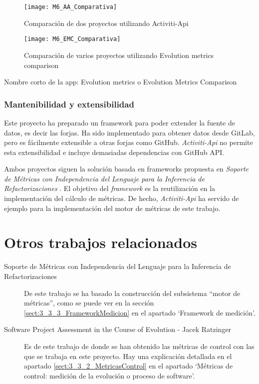 \begin{figure}[!h]
	\centering
	\texttt{[image: M6\_AA\_Comparativa]}
	\caption{Comparación de dos proyectos utilizando Activiti-Api}\label{fig:M6_AA_Comparativa}
\end{figure}
\FloatBarrier

\begin{figure}[!h]
	\centering
	\texttt{[image: M6\_EMC\_Comparativa]}
	\caption{Comparación de varios proyectos utilizando Evolution metrics comparison}\label{fig:M6_EMC_Comparativa}
\end{figure}
\FloatBarrier

\todo Nombre corto de la app: Evolution metrics o Evolution Metrics Comparison

\subsubsection{Mantenibilidad y extensibilidad}

Este proyecto ha preparado un  framework para poder extender la fuente de datos, es decir las forjas. Ha sido implementado para obtener datos desde GitLab, pero es fácilmente extensible a otras forjas como GitHub. \textit{Activiti-Api} no permite esta extensibilidad e incluye demasiadas dependencias con GitHub API.

Ambos proyectos siguen la solución basada en frameworks propuesta en \textit{Soporte de Métricas con Independencia del Lenguaje para la Inferencia de Refactorizaciones} \cite{marticorena_soporte_2005}. El objetivo del \textit{framework} es la reutilización en la implementación del cálculo de métricas. De hecho, \textit{Activiti-Api} ha servido de ejemplo para la implementación del motor de métricas de este trabajo.

\section{Otros trabajos relacionados}
\begin{description}
	\item[Soporte de Métricas con Independencia del Lenguaje para la Inferencia de Refactorizaciones] De este trabajo se ha basado la construcción del subsistema ``motor de métricas'', como se puede ver en la sección \ref{sect:3_3_3_FrameworkMedicion} en el apartado `Framework de medición'.
	\item[Software Project Assessment in the Course of Evolution -  Jacek Ratzinger] Es de este trabajo de donde se han obtenido las métricas de control con las que se trabaja en este proyecto. Hay una explicación detallada en el apartado \ref{sect:3_3_2_MetricasControl} en el apartado `Métricas de control: medición de la evolución o proceso de software'.
\end{description}

